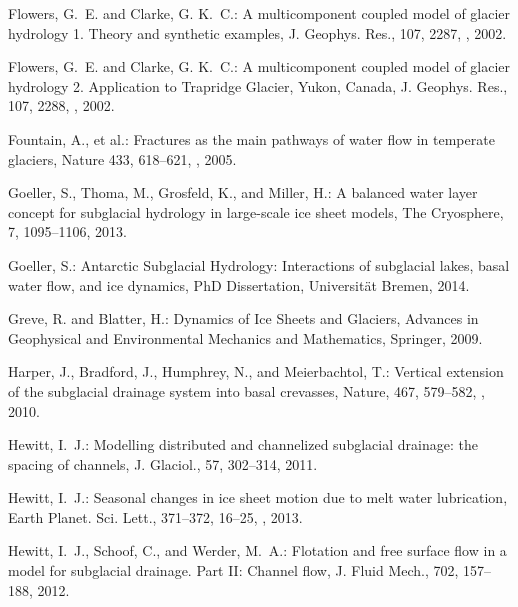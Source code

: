 \documentclass[gmd]{copernicus}   %
\begin{document}
\begin{thebibliography}{}
Flowers, G.~E. and Clarke, G. K.~C.: A multicomponent coupled model of glacier
  hydrology 1. {T}heory and synthetic examples, J. Geophys. Res., 107, 2287,
  , 2002{}.

Flowers, G.~E. and Clarke, G. K.~C.: A multicomponent coupled model of glacier
  hydrology 2. {A}pplication to {T}rapridge {G}lacier, {Y}ukon, {C}anada, J.
  Geophys. Res., 107, 2288, , 2002{}.

Fountain, A., et al.: Fractures as the main pathways of water flow in temperate glaciers, Nature 433, 618--621, , 2005.

Goeller, S., Thoma, M., Grosfeld, K., and Miller, H.: A balanced water layer
  concept for subglacial hydrology in large-scale ice sheet models, The
  Cryosphere, 7, 1095--1106, 2013.

Goeller, S.: Antarctic {S}ubglacial {H}ydrology: {I}nteractions of subglacial lakes, basal water flow, and ice dynamics, PhD Dissertation, Universit\"at Bremen, 2014.

Greve, R. and Blatter, H.: Dynamics of {I}ce {S}heets and {G}laciers, Advances
  in Geophysical and Environmental Mechanics and Mathematics, Springer, 2009.

Harper, J., Bradford, J., Humphrey, N., and Meierbachtol, T.: Vertical
  extension of the subglacial drainage system into basal crevasses, Nature,
  467, 579--582, , 2010.

Hewitt, I.~J.: Modelling distributed and channelized subglacial drainage: the
  spacing of channels, J. Glaciol., 57, 302--314, 2011.

Hewitt, I.~J.: Seasonal changes in ice sheet motion due to melt water
  lubrication, Earth Planet. Sci. Lett., 371--372, 16--25,
  , 2013.

Hewitt, I.~J., Schoof, C., and Werder, M.~A.: Flotation and free surface flow
  in a model for subglacial drainage. {P}art {II}: {C}hannel flow, J. Fluid
  Mech., 702, 157--188, 2012.


\end{thebibliography}
\end{document}
